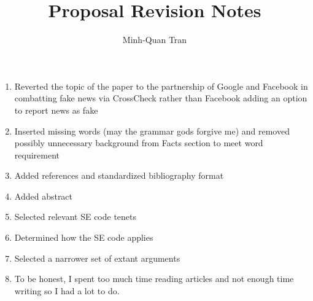 \documentclass[12pt]{article}
\title{Proposal Revision Notes}
\author{Minh-Quan Tran}
\begin{document}
\maketitle

%
%
\begin{multicols}{2}
\begin{enumerate}

\item{Reverted the topic of the paper to the partnership of Google and Facebook in combatting fake news via CrossCheck rather than Facebook adding an option to report news as fake}

\item{Inserted missing words (may the grammar gods forgive me) and removed possibly unnecessary background from Facts section to meet word requirement}

\item{Added references and standardized bibliography format}

\item{Added abstract}

\item{Selected relevant SE code tenets}

\item{Determined how the SE code applies}

\item{Selected a narrower set of extant arguments}

\item{To be honest, I spent too much time reading articles and not enough time writing so I had a lot to do.}

\end{enumerate}

\end{multicols}
\end{document}
